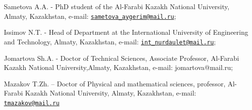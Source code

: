\begin{authorinfo}
Sametova A.A. - PhD student of the Al-Farabi Kazakh National University,
Almaty, Kazakhstan, e-mail:
\href{mailto:sametova_aygerim@mail.ru}{\nolinkurl{sametova\_aygerim@mail.ru}};

Issimov N.T. - Head of Department at the International University of
Engineering and Technology, Almaty, Kazakhstan, e-mail:
\href{mailto:int_nurdaulet@mail.ru}{\nolinkurl{int\_nurdaulet@mail.ru}};

Jomartova Sh.A. - Doctor of Technical Sciences, Associate Professor,
Al-Farabi Kazakh National University,Almaty, Kazakhstan, e-mail:
jomartova@mail.ru;

Mazakov T.Zh. -- Doctor of Physical and mathematical sciences,
professor, Al-Farabi Kazakh National University, Almaty, Kazakhstan,
e-mail: \href{mailto:tmazakov@mail.ru}{\nolinkurl{tmazakov@mail.ru}}
\end{authorinfo}
